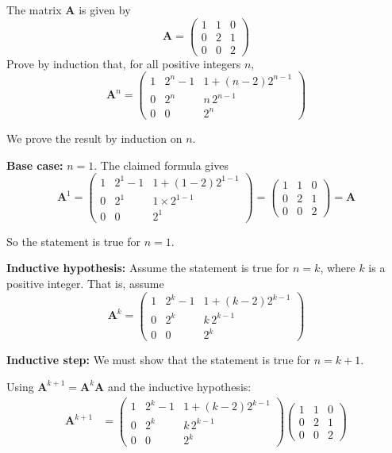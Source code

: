 \documentclass[leqno]{article}
\begin{document}
\begin{enumerate}[
  label=\textbf{\arabic*.},
  leftmargin=*,
  topsep=0pt,
  partopsep=0pt,
  parsep=0pt
]
\questionitem

The matrix $\mathbf{A}$ is given by
\[
\mathbf{A} = \begin{pmatrix}
1 & 1 & 0 \\
0 & 2 & 1 \\
0 & 0 & 2
\end{pmatrix}
\]
Prove by induction that, for all positive integers $n$,
\[
\renewcommand{\arraystretch}{1.4}
\mathbf{A}^n = \begin{pmatrix}
1 & 2^n - 1 & 1 + (n-2)2^{n-1} \\
0 & 2^n & n\,2^{n-1} \\
0 & 0 & 2^n
\end{pmatrix}
\]

\vspace*{10pt}

\begin{djsSolution}
We prove the result by induction on $n$.

\textbf{Base case:} $n=1$. The claimed formula gives
\[
\mathbf{A}^1=
\begin{pmatrix}
1 & 2^1-1 & 1+(1-2)2^{1-1} \\
0 & 2^1 & 1\times 2^{1-1} \\
0 & 0 & 2^1
\end{pmatrix}
=
\begin{pmatrix}
1 & 1 & 0 \\
0 & 2 & 1 \\
0 & 0 & 2
\end{pmatrix}
=
\mathbf{A}
\]

So the statement is true for $n=1$.

\textbf{Inductive hypothesis:} Assume the statement is true for $n=k$, where $k$ is a positive integer. That is, assume
\[
\mathbf{A}^k=
\begin{pmatrix}
1 & 2^k-1 & 1+(k-2)2^{k-1} \\
0 & 2^k & k\,2^{k-1} \\
0 & 0 & 2^k
\end{pmatrix}
\]

\textbf{Inductive step:} We must show that the statement is true for $n=k+1$.

Using $\mathbf{A}^{k+1}=\mathbf{A}^k\mathbf{A}$ and the inductive hypothesis:
\begin{align*}
\mathbf{A}^{k+1}
&=
\begin{pmatrix}
1 & 2^k-1 & 1+(k-2)2^{k-1} \\
0 & 2^k & k\,2^{k-1} \\
0 & 0 & 2^k
\end{pmatrix}
\begin{pmatrix}
1 & 1 & 0 \\
0 & 2 & 1 \\
0 & 0 & 2
\end{pmatrix}
\end{align*}


\end{djsSolution}
\end{enumerate}
\end{document}
